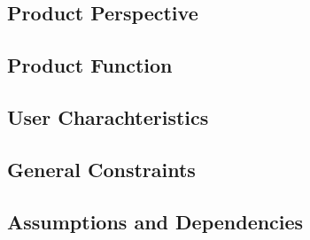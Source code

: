 \subsection{Product Perspective}
\subsection{Product Function}
\subsection{User Charachteristics}
\subsection{General Constraints}
\subsection{Assumptions and Dependencies}
